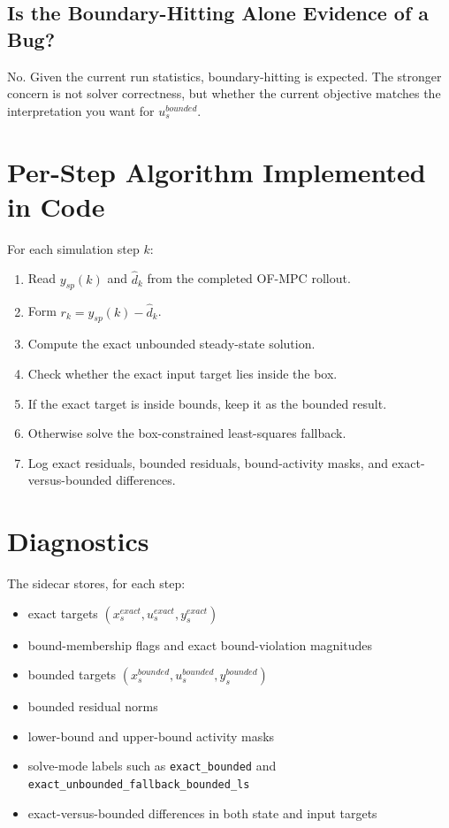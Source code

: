 \documentclass[11pt]{article}
\begin{document}
\subsection{Is the Boundary-Hitting Alone Evidence of a Bug?}

No. Given the current run statistics, boundary-hitting is expected. The stronger concern is not solver correctness, but whether the current objective matches the interpretation you want for $u_s^{bounded}$.

\section{Per-Step Algorithm Implemented in Code}

For each simulation step $k$:
\begin{enumerate}
\item Read $y_{sp}(k)$ and $\hat d_k$ from the completed OF-MPC rollout.
\item Form $r_k = y_{sp}(k) - \hat d_k$.
\item Compute the exact unbounded steady-state solution.
\item Check whether the exact input target lies inside the box.
\item If the exact target is inside bounds, keep it as the bounded result.
\item Otherwise solve the box-constrained least-squares fallback.
\item Log exact residuals, bounded residuals, bound-activity masks, and exact-versus-bounded differences.
\end{enumerate}

\section{Diagnostics}

The sidecar stores, for each step:
\begin{itemize}
\item exact targets $(x_s^{exact}, u_s^{exact}, y_s^{exact})$
\item bound-membership flags and exact bound-violation magnitudes
\item bounded targets $(x_s^{bounded}, u_s^{bounded}, y_s^{bounded})$
\item bounded residual norms
\item lower-bound and upper-bound activity masks
\item solve-mode labels such as \texttt{exact\_bounded} and \texttt{exact\_unbounded\_fallback\_bounded\_ls}
\item exact-versus-bounded differences in both state and input targets
\end{itemize}
\end{document}
